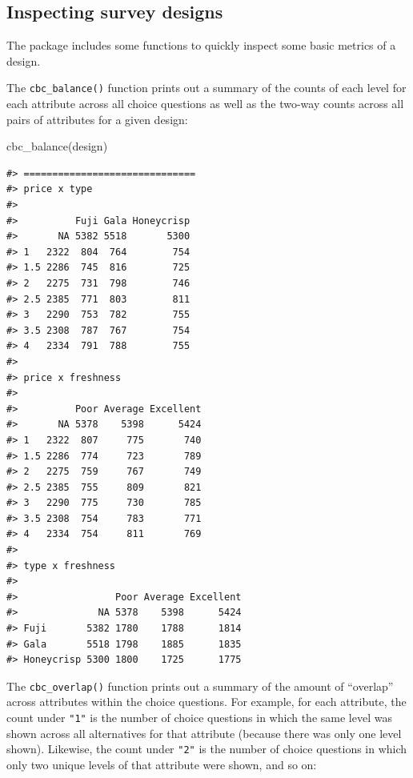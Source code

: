 \documentclass[
  12pt,
]{article}
\newenvironment{Shaded}{\begin{snugshade}}{\end{snugshade}}
\newcommand{\FunctionTok}[1]{\textcolor[rgb]{0.00,0.00,0.00}{#1}}
\newcommand{\NormalTok}[1]{#1}
\begin{document}
\hypertarget{inspecting-survey-designs}{%
\subsection{Inspecting survey designs}\label{inspecting-survey-designs}}

The package includes some functions to quickly inspect some basic
metrics of a design.

The \texttt{cbc\_balance()} function prints out a summary of the counts
of each level for each attribute across all choice questions as well as
the two-way counts across all pairs of attributes for a given design:

\begin{Shaded}
\begin{Highlighting}[]
\FunctionTok{cbc\_balance}\NormalTok{(design)}
\end{Highlighting}
\end{Shaded}

\begin{verbatim}
#> ==============================
#> price x type 
#> 
#>          Fuji Gala Honeycrisp
#>       NA 5382 5518       5300
#> 1   2322  804  764        754
#> 1.5 2286  745  816        725
#> 2   2275  731  798        746
#> 2.5 2385  771  803        811
#> 3   2290  753  782        755
#> 3.5 2308  787  767        754
#> 4   2334  791  788        755
#> 
#> price x freshness 
#> 
#>          Poor Average Excellent
#>       NA 5378    5398      5424
#> 1   2322  807     775       740
#> 1.5 2286  774     723       789
#> 2   2275  759     767       749
#> 2.5 2385  755     809       821
#> 3   2290  775     730       785
#> 3.5 2308  754     783       771
#> 4   2334  754     811       769
#> 
#> type x freshness 
#> 
#>                 Poor Average Excellent
#>              NA 5378    5398      5424
#> Fuji       5382 1780    1788      1814
#> Gala       5518 1798    1885      1835
#> Honeycrisp 5300 1800    1725      1775
\end{verbatim}

The \texttt{cbc\_overlap()} function prints out a summary of the amount
of ``overlap'' across attributes within the choice questions. For
example, for each attribute, the count under \texttt{"1"} is the number
of choice questions in which the same level was shown across all
alternatives for that attribute (because there was only one level
shown). Likewise, the count under \texttt{"2"} is the number of choice
questions in which only two unique levels of that attribute were shown,
and so on:
\end{document}
